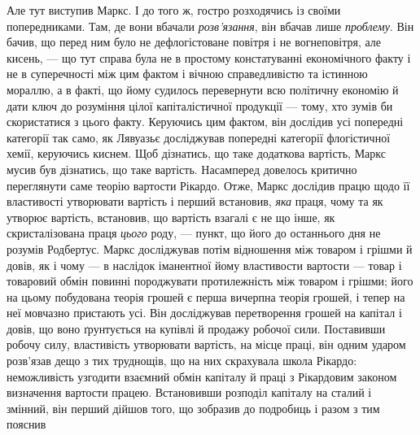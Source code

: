 Але тут виступив Маркс. І до того ж, гостро розходячись із своїми
попередниками. Там, де вони вбачали \emph{розв’язання}, він вбачав лише
\emph{проблему}. Він бачив, що перед ним було не дефлогістоване повітря і не
вогнеповітря, але кисень, — що тут справа була не в простому констатуванні
економічного факту і не в суперечності між цим фактом і вічною
справедливістю та істинною мораллю, а в факті, що йому судилось
перевернути всю політичну економію й дати ключ до розуміння цілої
капіталістичної продукції — тому, хто зумів би скористатися з цього
факту. Керуючись цим фактом, він дослідив усі попередні категорії так
само, як Лявуазьє досліджував попередні категорії флогістичної хемії, керуючись
киснем. Щоб дізнатись, що таке додаткова вартість, Маркс мусив
був дізнатись, що таке вартість. Насамперед довелось критично переглянути
саме теорію вартости Рікардо. Отже, Маркс дослідив працю щодо її
властивості утворювати вартість і перший встановив, \emph{яка} праця, чому та
як утворює вартість, встановив, що вартість взагалі є не що інше, як
скристалізована праця \emph{цього} роду, — пункт, що його до останнього дня не
розумів Родбертус. Маркс досліджував потім відношення між товаром і
грішми й довів, як і чому — в наслідок іманентної йому властивости вартости —
товар і товаровий обмін повинні породжувати протилежність між товаром
і грішми; його на цьому побудована теорія грошей є перша вичерпна
теорія грошей, і тепер на неї мовчазно пристають усі. Він досліджував
перетворення грошей на капітал і довів, що воно ґрунтується на купівлі
й продажу робочої сили. Поставивши робочу силу, властивість утворювати
вартість, на місце праці, він одним ударом розв’язав дещо з тих
труднощів, що на них скрахувала школа Рікардо: неможливість узгодити
взаємний обмін капіталу й праці з Рікардовим законом визначення вартости
працею. Встановивши розподіл капіталу на сталий і змінний, він
перший дійшов того, що зобразив до подробиць і разом з тим пояснив
\parbreak{}  %
